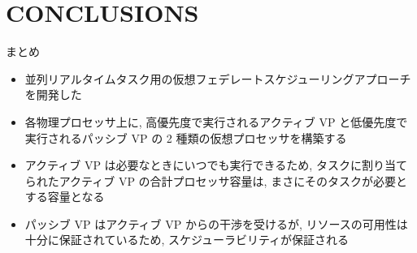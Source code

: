 
\section{CONCLUSIONS}
\label{sec: conclusions}

\begin{frame}{まとめ}
    \begin{itemize}
        \item 並列リアルタイムタスク用の仮想フェデレートスケジューリングアプローチを開発した
        \item 各物理プロセッサ上に, 高優先度で実行されるアクティブ VP と低優先度で実行されるパッシブ VP の 2 種類の仮想プロセッサを構築する
        \item アクティブ VP は必要なときにいつでも実行できるため, タスクに割り当てられたアクティブ VP の合計プロセッサ容量は, まさにそのタスクが必要とする容量となる
        \item パッシブ VP はアクティブ VP からの干渉を受けるが, リソースの可用性は十分に保証されているため, スケジューラビリティが保証される
    \end{itemize}
\end{frame}

